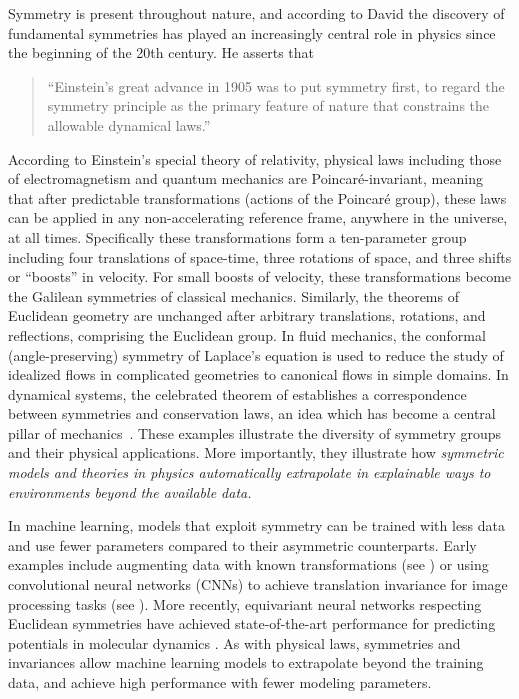 \documentclass[twoside,11pt]{article}
\begin{document}
Symmetry is present throughout nature, 
and according to David \cite{Gross1996role} the discovery of fundamental symmetries has played an increasingly central role in physics since the beginning of the 20th century.
He asserts that
\vspace{-.1in}\begin{quote}
   ``Einstein’s great advance in 1905 was to put symmetry first, to regard the symmetry principle as the primary feature of nature that constrains the allowable dynamical laws.''
\end{quote}
\vspace{-.025in}
According to Einstein's special theory of relativity, physical laws including those of electromagnetism and quantum mechanics are Poincar\'{e}-invariant, meaning that after predictable transformations (actions of the Poincar\'{e} group), these laws can be applied in any non-accelerating reference frame, anywhere in the universe, at all times.
Specifically these transformations form a ten-parameter group including four translations of space-time, three rotations of space, and three shifts or ``boosts'' in velocity.
For small boosts of velocity, these transformations become the Galilean symmetries of classical mechanics.
Similarly, the theorems of Euclidean geometry are unchanged after arbitrary translations, rotations, and reflections, comprising the Euclidean group.
In fluid mechanics, the conformal (angle-preserving) symmetry of Laplace's equation is used to reduce the study of idealized flows in complicated geometries to canonical flows in simple domains.
In dynamical systems, the celebrated theorem of \citet{noether1918invariante} establishes a correspondence between symmetries and conservation laws, an idea which has become a central pillar of mechanics~\citep{Abraham2008foundations}.
These examples illustrate the diversity of symmetry groups and their physical applications.
More importantly, they illustrate how \emph{symmetric models and theories in physics automatically extrapolate in explainable ways to environments beyond the available data.}


In machine learning, models that exploit symmetry can be trained with less data and use fewer parameters compared to their asymmetric counterparts.
Early examples include augmenting data with known transformations (see \cite{shorten2019survey, van2001art}) or using convolutional neural networks (CNNs) to achieve translation invariance for image processing tasks (see \cite{fukushima1980neocognitron, lecun1989backpropagation}).
More recently, equivariant neural networks respecting Euclidean symmetries have achieved state-of-the-art performance for predicting potentials in molecular dynamics \cite{batzner2022e3atom}. 
As with physical laws, symmetries and invariances allow machine learning models to extrapolate beyond the training data, and achieve high performance with fewer modeling parameters.
\end{document}
